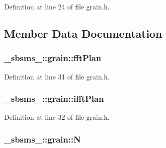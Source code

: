Definition at line 24 of file grain.\+h.



\subsection{Member Data Documentation}
\subsubsection[{\texorpdfstring{fft\+Plan}{fftPlan}}]{ \+\_\+sbsms\+\_\+\+::grain\+::fft\+Plan\hspace{0.3cm}{\ttfamily [protected]}}\hypertarget{class__sbsms___1_1grain_ae6d6c60eaef37e3383f623aa075e02d0}{}\label{class__sbsms___1_1grain_ae6d6c60eaef37e3383f623aa075e02d0}


Definition at line 31 of file grain.\+h.

\subsubsection[{\texorpdfstring{ifft\+Plan}{ifftPlan}}]{ \+\_\+sbsms\+\_\+\+::grain\+::ifft\+Plan\hspace{0.3cm}{\ttfamily [protected]}}\hypertarget{class__sbsms___1_1grain_a13f6cf54f6fb64484142871ebf0e5d30}{}\label{class__sbsms___1_1grain_a13f6cf54f6fb64484142871ebf0e5d30}


Definition at line 32 of file grain.\+h.

\subsubsection[{\texorpdfstring{N}{N}}]{ \+\_\+sbsms\+\_\+\+::grain\+::N\hspace{0.3cm}{\ttfamily [protected]}}\hypertarget{class__sbsms___1_1grain_a007c0c0c9a0eed728ae3fb4aa379b145}{}\label{class__sbsms___1_1grain_a007c0c0c9a0eed728ae3fb4aa379b145}


